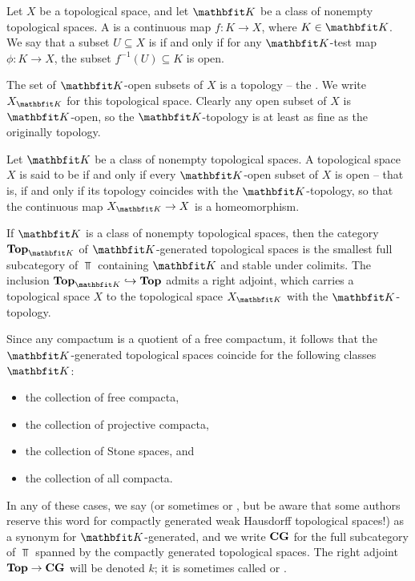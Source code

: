 \begin{dfn}
	Let $ X $ be a topological space, and let $ \KK $ be a class of nonempty topological spaces.
	A  is a continuous map $ f \colon K \to X $, where $ K \in \KK $.
	We say that a subset $ U \subseteq X $ is  if and only if for any $ \KK $-test map $ \phi \colon K \to X $, the subset $ f^{-1}(U) \subseteq K $ is open.
\end{dfn}

\begin{nul}
	The set of $ \KK $-open subsets of $ X $ is a topology -- the .
	We write $ X_{\KK} $ for this topological space.
	Clearly any open subset of $ X $ is $ \KK $-open, so the $ \KK $-topology is at least as fine as the originally topology.
\end{nul}

\begin{dfn}
	Let $ \KK $ be a class of nonempty topological spaces.
	A topological space $ X $ is said to be  if and only if every $ \KK $-open subset of $ X $ is open -- that is, if and only if its topology coincides with the $ \KK $-topology, so that the continuous map $ X_{\KK} \to X $ is a homeomorphism.
\end{dfn}

\begin{nul}
	If $ \KK $ is a class of nonempty topological spaces, then the category $ \Top_{\KK} $ of $ \KK $-generated topological spaces is the smallest full subcategory of $ \Top $ containing $ \KK $ and stable under colimits.
	The inclusion $ \Top_{\KK} \inclusion \Top $ admits a right adjoint, which carries a topological space $ X $ to the topological space $ X_{\KK} $ with the $ \KK $-topology.
\end{nul}

\begin{exm}
	Since any compactum is a quotient of a free compactum, it follows that the $ \KK $-generated topological spaces coincide for the following classes $ \KK $:
	\begin{itemize}
		\item the collection of free compacta,
		\item the collection of projective compacta,
		\item the collection of Stone spaces, and
		\item the collection of all compacta.
	\end{itemize}
	In any of these cases, we say  (or sometimes  or , but be aware that some authors reserve this word for compactly generated weak Hausdorff topological spaces!) as a synonym for $ \KK $-generated, and we write $ \textbf{\textup{CG}} $ for the full subcategory of $ \Top $ spanned by the compactly generated topological spaces.
	The right adjoint $ \textbf{\textup{Top}} \to \textbf{\textup{CG}} $ will be denoted $ k $;
	it is sometimes called  or .
\end{exm}

